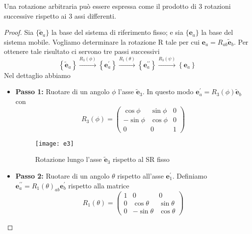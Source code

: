 \begin{theorem}
	Una rotazione arbitraria pu\`{o} essere espressa come il prodotto di 3 rotazioni successive rispetto ai 3 assi differenti.
\end{theorem}
\begin{proof}
	Sia $\{\tilde{\bm{e}}_{a}\}$ la base del sistema di riferimento fisso; e sia $\{\bm{e}_{a}\}$ la base del sistema mobile. Vogliamo determinare la rotazione R tale per cui $\bm{e}_{a} = R_{ab}\tilde{\bm{e}}_{b}$. Per ottenere tale risultato ci servono tre passi successivi
	\begin{equation*}
\left\{\tilde{\mathbf{e}}_a\right\} \xrightarrow{R_3(\phi)}\left\{\mathbf{e}_a^{\prime}\right\} \xrightarrow{R_1(\theta)}\left\{\mathbf{e}_a^{\prime \prime}\right\} \xrightarrow{R_3(\psi)}\left\{\mathbf{e}_a\right\}
\end{equation*}
Nel dettaglio abbiamo
\begin{itemize}
	\item \textbf{Passo 1:} Ruotare di un angolo $\phi$ l'asse $\bm{\tilde{e}}_3$. In questo modo $\bm{e}_{a}^{\prime} = R_3(\phi)\tilde{\bm{e}}_{b}$ con 
	\begin{equation*}
R_3(\phi)=\left(\begin{array}{ccc}
\cos \phi & \sin \phi & 0 \\
-\sin \phi & \cos \phi & 0 \\
0 & 0 & 1
\end{array}\right)
\end{equation*}
 
\begin{figure}[!ht]
\vspace{0.1in}
\texttt{[image: e3]}	
\centering
\vspace{0.1in}
\caption{Rotazione lungo l'asse $\bm{\tilde{e}}_3$ rispetto al SR fisso }
\end{figure}

\item \textbf{Passo 2:} Ruotare di un angolo $\theta$ rispetto all'asse $\bm{e}_{1}^{\prime}$. Definiamo $\bm{e}_{a}^{\prime \prime} = R_1(\theta)_{ab}\bm{e}^{\prime}_{b}$ rispetto alla matrice 
\begin{equation*}
R_1(\theta)=\left(\begin{array}{ccc}
1 & 0 & 0 \\
0 & \cos \theta & \sin \theta \\
0 & -\sin \theta & \cos \theta
\end{array}\right)
\end{equation*}


\end{itemize}
\end{proof}
